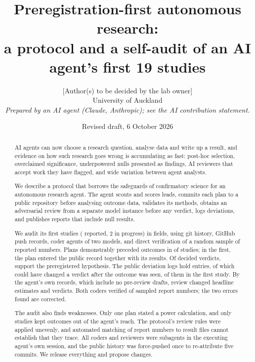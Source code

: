 \documentclass[11pt]{article}
\title{Preregistration-first autonomous research:\\a protocol and a self-audit of an AI agent's first 19 studies}
\author{[Author(s) to be decided by the lab owner]\\University of Auckland\\[4pt]
\small\textit{Prepared by an AI agent (Claude, Anthropic); see the AI contribution statement.}}
\date{Revised draft, 6 October 2026}
\begin{document}
\maketitle

\begin{abstract}
\noindent AI agents can now choose a research question, analyse data and write up a result, and evidence on how such
research goes wrong is accumulating as fast: post-hoc selection, overclaimed significance, underpowered nulls
presented as findings, AI reviewers that accept work they have flagged, and wide variation between agent analysts.

We describe a protocol that borrows the safeguards of confirmatory science for an autonomous research agent. The agent
scouts and scores leads, commits each plan to a public repository before analysing outcome data, validates its
methods, obtains an adversarial review from a separate model instance before any verdict, logs deviations, and
publishes reports that include null results.

We audit its first \StudiesTotal{} studies (\StudiesReported{} reported, 2 in progress) in \StudyDomains{} fields,
using git history, GitHub push records, coder agents of two models, and direct verification of a random sample of
reported numbers. Plans demonstrably preceded outcomes in \PreregPassClassified{} of \StudiesTotal{} studies; in the
first, the plan entered the public record together with its results. Of \VerdictsDecided{} decided verdicts,
\VerdictSupported{} support the preregistered hypothesis. The public deviation logs hold \DevN{} entries, of which
\DevRelevantAfter{} could have changed a verdict after the outcome was seen, \DevRelevantAfterGWTC{} of them in the
first study. By the agent's own records, which include no pre-review drafts, review changed \ReviewHeadlineChanged{}
headline estimates and \ReviewVerdictChanged{} verdicts. Both coders verified \VerifyOKBoth{} of \VerifyN{} sampled
report numbers; the two errors found are corrected.

The audit also finds weaknesses. Only one plan stated a power calculation, and only \InvBlindStrong{} studies kept
outcomes out of the agent's reach. The protocol's review rules were applied unevenly, and automated matching of report
numbers to result files cannot establish that they trace. All coders and reviewers were subagents in the executing
agent's own session, and the public history was force-pushed once to re-attribute five commits. We release everything
and propose changes.
\end{abstract}
\end{document}
